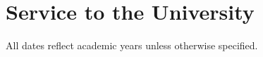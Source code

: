 \documentclass[10pt,letterpaper,final]{moderncv}
\begin{document}



\section{\textbf{Service to the University}}
{All dates reflect academic years unless otherwise specified. } 

\end{document}
